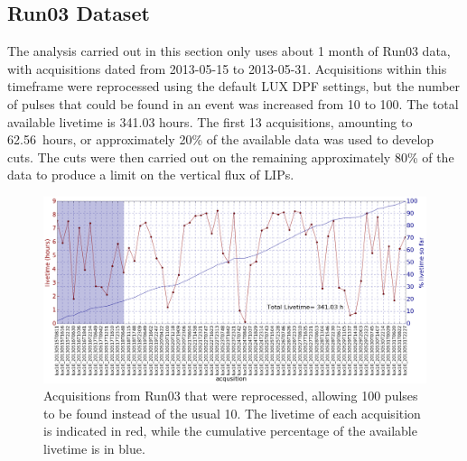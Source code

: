 \subsection{Run03 Dataset}
The analysis carried out in this section only uses about 1 month of Run03 data, with acquisitions dated from 2013-05-15 to 2013-05-31. Acquisitions within this timeframe were reprocessed using the default \ac{LUX} \ac{DPF} settings, but the number of pulses that could be found in an event was increased from 10 to 100. The total available livetime is 341.03 hours. The first 13 acquisitions, amounting to 62.56~hours, or approximately 20\% of the available data was used to develop cuts. The cuts were then carried out on the remaining approximately 80\% of the data to produce a limit on the vertical flux of \ac{LIP}s. 

\begin{figure}[htbp]
\begin{center}
\includegraphics[width=\textwidth]{figures/lips/livetime.png}
\caption{Acquisitions from Run03 that were reprocessed, allowing 100 pulses to be found instead of the usual 10. The livetime of each acquisition is indicated in red, while the cumulative percentage of the available livetime is in blue. }
\label{fig:livetime}
\end{center}
\end{figure}

\FloatBarrier
